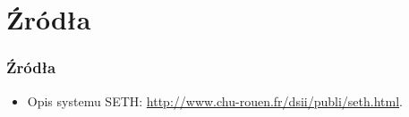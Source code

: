 \section{Źródła}

\begin{frame}
    \frametitle{Źródła}
    \begin{itemize}
        \item Opis systemu SETH: \url{http://www.chu-rouen.fr/dsii/publi/seth.html}.
    \end{itemize}
\end{frame}

